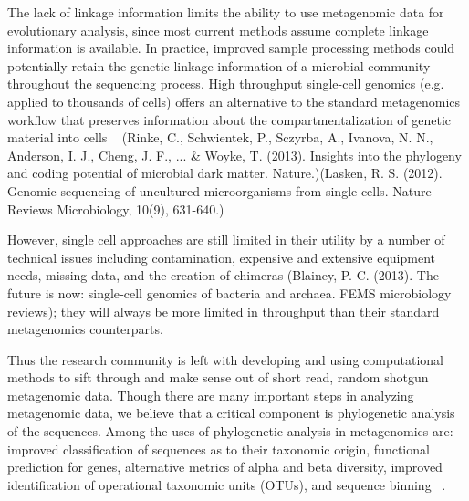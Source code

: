 \documentclass[10pt]{article}
\begin{document}
The lack of linkage information limits the ability to use metagenomic data for evolutionary analysis, since most current methods assume complete linkage information is available.
In practice, improved sample processing methods could potentially retain the genetic linkage information of a microbial community throughout the sequencing process.
High throughput single-cell genomics (e.g. applied to thousands of cells) offers an alternative to the standard metagenomics workflow that preserves information about the compartmentalization of genetic material into cells ~\cite{Woyke2010} (Rinke, C., Schwientek, P., Sczyrba, A., Ivanova, N. N., Anderson, I. J., Cheng, J. F., ... & Woyke, T. (2013). Insights into the phylogeny and coding potential of microbial dark matter. Nature.)(Lasken, R. S. (2012). Genomic sequencing of uncultured microorganisms from single cells. Nature Reviews Microbiology, 10(9), 631-640.)

However, single cell approaches are still limited in their utility by a number of technical issues including contamination, expensive and extensive equipment needs, missing data, and the creation of chimeras (Blainey, P. C. (2013). The future is now: single‐cell genomics of bacteria and archaea. FEMS microbiology reviews); they will always be more limited in throughput than their standard metagenomics counterparts.

Thus the research community is left with developing and using computational methods to sift through and make sense out of short read, random shotgun metagenomic data.
Though there are many important steps in analyzing metagenomic data, we believe that a critical component is phylogenetic analysis of the sequences.
Among the uses of phylogenetic analysis in metagenomics are: improved classification of sequences as to their taxonomic origin, functional prediction for genes, alternative metrics of alpha and beta diversity, improved identification of operational taxonomic units (OTUs), and sequence binning ~\cite{meyer2008metagenomics, Matsen2010, Evans2010, Kembel2011, Matsen2012, Stark2010, Wu2012, Brady2009, Brady2011, Sharpton2011}.
\end{document}
